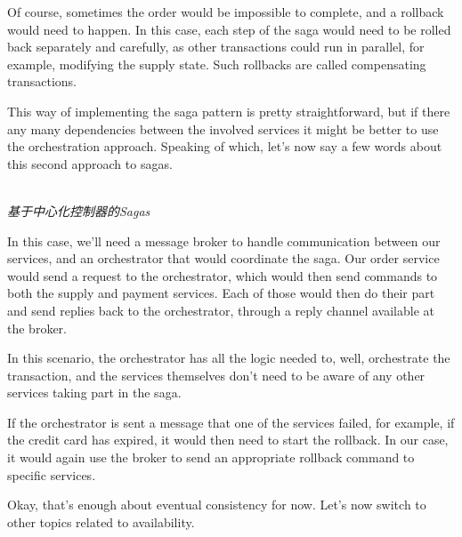 Of course, sometimes the order would be impossible to complete, and a rollback would need to happen. In this case, each step of the saga would need to be rolled back separately and carefully, as other transactions could run in parallel, for example, modifying the supply state. Such rollbacks are called compensating transactions.

This way of implementing the saga pattern is pretty straightforward, but if there any many dependencies between the involved services it might be better to use the orchestration approach. Speaking of which, let's now say a few words about this second approach to sagas.

\hspace*{\fill} \\ %
\noindent
\textit{基于中心化控制器的Sagas}

In this case, we'll need a message broker to handle communication between our services, and an orchestrator that would coordinate the saga. Our order service would send a request to the orchestrator, which would then send commands to both the supply and payment services. Each of those would then do their part and send replies back to the orchestrator, through a reply channel available at the broker. 

In this scenario, the orchestrator has all the logic needed to, well, orchestrate the transaction, and the services themselves don't need to be aware of any other services taking part in the saga.

If the orchestrator is sent a message that one of the services failed, for example, if the credit card has expired, it would then need to start the rollback. In our case, it would again use the broker to send an appropriate rollback command to specific services.

Okay, that's enough about eventual consistency for now. Let's now switch to other topics related to availability.




